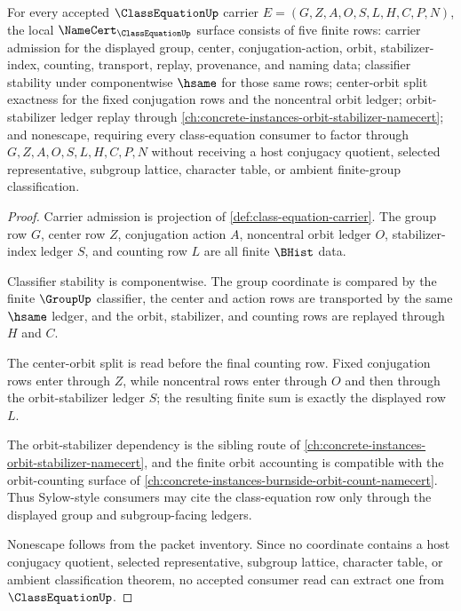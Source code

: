 \begin{theorem}
\label{thm:class-equation-namecert-obligations}
For every accepted $\ClassEquationUp$ carrier $E=(G,Z,A,O,S,L,H,C,P,N)$, the local $\NameCert_{\ClassEquationUp}$ surface consists of five finite rows: carrier admission for the displayed group, center, conjugation-action, orbit, stabilizer-index, counting, transport, replay, provenance, and naming data; classifier stability under componentwise $\hsame$ for those same rows; center-orbit split exactness for the fixed conjugation rows and the noncentral orbit ledger; orbit-stabilizer ledger replay through \autoref{ch:concrete-instances-orbit-stabilizer-namecert}; and nonescape, requiring every class-equation consumer to factor through $G,Z,A,O,S,L,H,C,P,N$ without receiving a host conjugacy quotient, selected representative, subgroup lattice, character table, or ambient finite-group classification.
\end{theorem}
\begin{proof}
Carrier admission is projection of \autoref{def:class-equation-carrier}. The group row $G$, center row $Z$, conjugation action $A$, noncentral orbit ledger $O$, stabilizer-index ledger $S$, and counting row $L$ are all finite $\BHist$ data.

Classifier stability is componentwise. The group coordinate is compared by the finite $\GroupUp$ classifier, the center and action rows are transported by the same $\hsame$ ledger, and the orbit, stabilizer, and counting rows are replayed through $H$ and $C$.

The center-orbit split is read before the final counting row. Fixed conjugation rows enter through $Z$, while noncentral rows enter through $O$ and then through the orbit-stabilizer ledger $S$; the resulting finite sum is exactly the displayed row $L$.

The orbit-stabilizer dependency is the sibling route of \autoref{ch:concrete-instances-orbit-stabilizer-namecert}, and the finite orbit accounting is compatible with the orbit-counting surface of \autoref{ch:concrete-instances-burnside-orbit-count-namecert}. Thus Sylow-style consumers may cite the class-equation row only through the displayed group and subgroup-facing ledgers.

Nonescape follows from the packet inventory. Since no coordinate contains a host conjugacy quotient, selected representative, subgroup lattice, character table, or ambient classification theorem, no accepted consumer read can extract one from $\ClassEquationUp$.
\end{proof}

